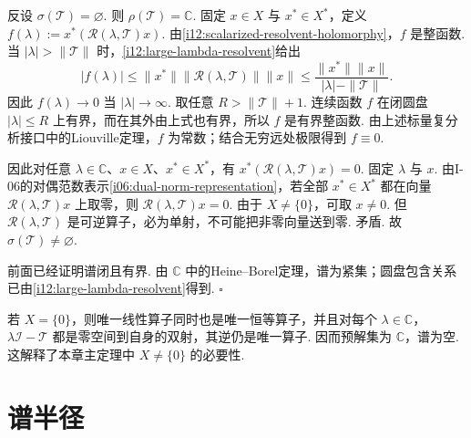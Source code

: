 \begin{FAProof}
反设 \(\displaystyle \sigma(\mathcal T)=\varnothing\). 则 \(\displaystyle \rho(\mathcal T)=\mathbb C\). 固定 \(\displaystyle x\in X\) 与 \(\displaystyle x^*\in X^*\)，定义
\(\displaystyle f(\lambda) := x^*(\mathcal R(\lambda,\mathcal T)x)\).
由\autoref{i12:scalarized-resolvent-holomorphy}，\(\displaystyle f\) 是整函数. 当 \(\displaystyle |\lambda|>\|\mathcal T\|\) 时，\autoref{i12:large-lambda-resolvent}给出
\[
|f(\lambda)|
\leqslant
\|x^*\|\|\mathcal R(\lambda,\mathcal T)\|\|x\|
\leqslant
\frac{\|x^*\|\|x\|}{|\lambda|-\|\mathcal T\|}.
\]
因此 \(\displaystyle f(\lambda)\to0\) 当 \(\displaystyle |\lambda|\to\infty\). 取任意 \(\displaystyle R>\|\mathcal T\|+1\). 连续函数 \(\displaystyle f\) 在闭圆盘 \(\displaystyle |\lambda|\leqslant R\) 上有界，而在其外由上式也有界，所以 \(\displaystyle f\) 是有界整函数. 由上述标量复分析接口中的Liouville定理，\(\displaystyle f\) 为常数；结合无穷远处极限得到 \(\displaystyle f\equiv0\).

因此对任意 \(\displaystyle \lambda\in\mathbb C\)、\(\displaystyle x\in X\)、\(\displaystyle x^*\in X^*\)，有
\(\displaystyle x^*(\mathcal R(\lambda,\mathcal T)x)=0\).
固定 \(\displaystyle \lambda\) 与 \(\displaystyle x\). 由I-06的对偶范数表示\autoref{i06:dual-norm-representation}，若全部 \(\displaystyle x^*\in X^*\) 都在向量 \(\displaystyle \mathcal R(\lambda,\mathcal T)x\) 上取零，则
\(\displaystyle \mathcal R(\lambda,\mathcal T)x=0\).
由于 \(\displaystyle X\neq\{0\}\)，可取 \(\displaystyle x\neq0\). 但 \(\displaystyle \mathcal R(\lambda,\mathcal T)\) 是可逆算子，必为单射，不可能把非零向量送到零. 矛盾. 故 \(\displaystyle \sigma(\mathcal T)\neq\varnothing\).

前面已经证明谱闭且有界. 由 \(\displaystyle \mathbb C\) 中的Heine--Borel定理，谱为紧集；圆盘包含关系已由\autoref{i12:large-lambda-resolvent}得到.
\hfill\(\square\)
\end{FAProof}

\begin{FARemark}[零空间边界]
若 \(\displaystyle X=\{0\}\)，则唯一线性算子同时也是唯一恒等算子，并且对每个 \(\displaystyle \lambda\in\mathbb C\)，\(\displaystyle \lambda\mathcal I-\mathcal T\) 都是零空间到自身的双射，其逆仍是唯一算子. 因而预解集为 \(\displaystyle \mathbb C\)，谱为空. 这解释了本章主定理中 \(\displaystyle X\neq\{0\}\) 的必要性.
\end{FARemark}

\section{谱半径}\label{sec:i12-spectral-radius}

